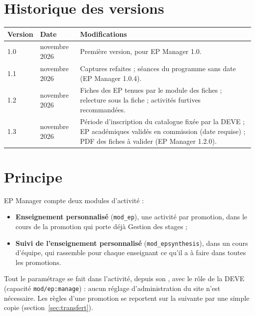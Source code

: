 \documentclass[11pt,a4paper]{article}
\begin{document}

\tableofcontents

\section*{Historique des versions}

\begin{center}
\begin{tabularx}{\linewidth}{@{}l l X@{}}
\toprule
\textbf{Version} & \textbf{Date} & \textbf{Modifications} \\
\midrule
1.0 & novembre 2026 & Première version, pour EP Manager 1.0. \\
1.1 & novembre 2026 & Captures refaites ; séances du programme sans date (EP Manager 1.0.4). \\
1.2 & novembre 2026 & Fiches des EP tenues par le module des fiches ; relecture sous la fiche ; activités furtives recommandées. \\
1.3 & novembre 2026 & Période d'inscription du catalogue fixée par la DEVE ; EP académiques validés en commission (date requise) ; PDF des fiches à valider (EP Manager 1.2.0). \\
\bottomrule
\end{tabularx}
\end{center}

\newpage

\section{Principe}

EP Manager compte deux modules d'activité :
\begin{itemize}
  \item \textbf{Enseignement personnalisé} (\texttt{mod\_ep}), une activité par promotion, dans
    le cours de la promotion qui porte déjà \og Gestion des stages\fg{} ;
  \item \textbf{Suivi de l'enseignement personnalisé} (\texttt{mod\_epsynthesis}), dans un cours
    d'équipe, qui rassemble pour chaque enseignant ce qu'il a à faire dans toutes les
    promotions.
\end{itemize}

Tout le paramétrage se fait dans l'activité, depuis son , avec le rôle
de la DEVE (capacité \texttt{mod/ep:manage}) : aucun réglage d'administration du site n'est
nécessaire. Les règles d'une promotion se reportent sur la suivante par une simple copie
(section~\ref{sec:transfert}).
\end{document}
